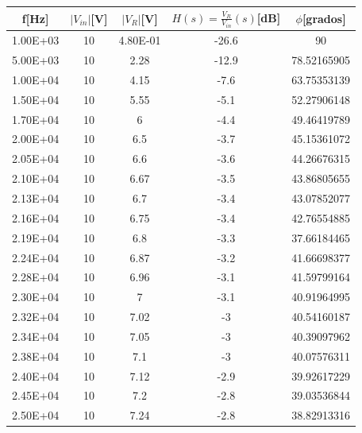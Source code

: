 \begin{table}[!htb]
\centering
\begin{tabular}{|c|c|c|c|c|}
\hline
f{[}Hz{]}    & $|V_{in}|${[}V{]} & $|V_R|${[}V{]}      & $H(s)=\frac{V_R}{V_{in}} (s)${[}dB{]} & $\phi${[}grados{]} \\ \hline
1.00E+03  & 10    & 4.80E-01 & -26.6           & 90                  \\ \hline
5.00E+03  & 10    & 2.28     & -12.9           & 78.52165905         \\ \hline
1.00E+04  & 10    & 4.15     & -7.6            & 63.75353139         \\ \hline
1.50E+04  & 10    & 5.55     & -5.1            & 52.27906148         \\ \hline
1.70E+04  & 10    & 6        & -4.4            & 49.46419789         \\ \hline
2.00E+04  & 10    & 6.5      & -3.7            & 45.15361072         \\ \hline
2.05E+04  & 10    & 6.6      & -3.6            & 44.26676315         \\ \hline
2.10E+04  & 10    & 6.67     & -3.5            & 43.86805655         \\ \hline
2.13E+04  & 10    & 6.7      & -3.4            & 43.07852077         \\ \hline
2.16E+04  & 10    & 6.75     & -3.4            & 42.76554885         \\ \hline
2.19E+04  & 10    & 6.8      & -3.3            & 37.66184465         \\ \hline
2.24E+04  & 10    & 6.87     & -3.2            & 41.66698377         \\ \hline
2.28E+04  & 10    & 6.96     & -3.1            & 41.59799164         \\ \hline
2.30E+04  & 10    & 7        & -3.1            & 40.91964995         \\ \hline
2.32E+04  & 10    & 7.02     & -3              & 40.54160187         \\ \hline
2.34E+04  & 10    & 7.05     & -3              & 40.39097962         \\ \hline
2.38E+04  & 10    & 7.1      & -3              & 40.07576311         \\ \hline
2.40E+04  & 10    & 7.12     & -2.9            & 39.92617229         \\ \hline
2.45E+04  & 10    & 7.2      & -2.8            & 39.03536844         \\ \hline
2.50E+04  & 10    & 7.24     & -2.8            & 38.82913316         \\ \hline

\end{tabular}
\end{table}
